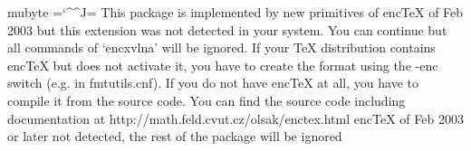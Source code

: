 
\expandafter\ifx\csname mubyte\endcsname\relax
   {\newlinechar=`\^^J\errhelp=
    {This package is implemented by new primitives of encTeX of Feb 2003^^J
     but this extension was not detected in your system. You can continue^^J
     but all commands of `encxvlna' will be ignored. If your TeX distribution^^J
     contains encTeX but does not activate it, you have to create the format^^J
     using the -enc switch (e.g. in fmtutils.cnf). If you do not have encTeX^^J
     at all, you have to compile it from the source code. You can find^^J
     the source code including documentation at^^J
     http://math.feld.cvut.cz/olsak/enctex.html
    }%
  \errmessage
    {encTeX of Feb 2003 or later not detected,^^Jthe rest of the package will be ignored}}%
  \expandafter\endinput\fi



\def\setmu #1#2{\mubyte #1##1 #2\endmubyte} %
\bgroup \uccode`X=\endlinechar \uppercase{\gdef\endchar{X}}
        \uccode`X=`\{          \uppercase{\gdef\leftbrace{X}}
\egroup

\def\sylabi #1{%
   \setmu \spacesylab {\space#1}     %
   \setmu \normalsylab {(#1}         %
   \setmu \normalsylab {\endchar#1}  %
   \setmu \normalsylab {[#1}         %
   \setmu \specsylab  {\leftbrace#1} %
}

\def\sylab #1{\sylabi {#1\space}\sylabi {#1\endchar}} 


\sylab v \sylab k \sylab o \sylab s \sylab u \sylab z
\sylab V \sylab K \sylab O \sylab S \sylab U \sylab Z
\sylab A \sylab I \sylab i \sylab a


\def\exx{\expandafter\expandafter\expandafter}
\def\spacesylab {\ifmmode\else\ifnum\catcode`\ =10 \exx\spacesylabP \fi\fi}
\def\normalsylab {\ifmmode\else\ifnum\catcode`\ =10 \exx\normalsylabP \fi\fi}
\def\specsylab {\ifmmode\else\ifnum\catcode`\ =10 \exx\specsylabP \fi\fi}
                
\def\spacesylabP {\afterassignment\spacesylabR \let\next= }
\def\spacesylabR {\ifhmode\unskip\fi \next \normalsylabP}
\def\normalsylabP #1 {#1~}
\def\specsylabP #1{{\normalsylabP #1}}

\def\uv{\futurelet\next\uvR}
\def\uvR{\ifx \next\specsylab \expandafter \uvS \else \expandafter \uvP \fi}
\long\def\uvP #1{\clqq#1\crqq}
\long\def\uvS \specsylab #1{\normalsylab \clqq#1\crqq}

\mubytein=2  %

\endinput



